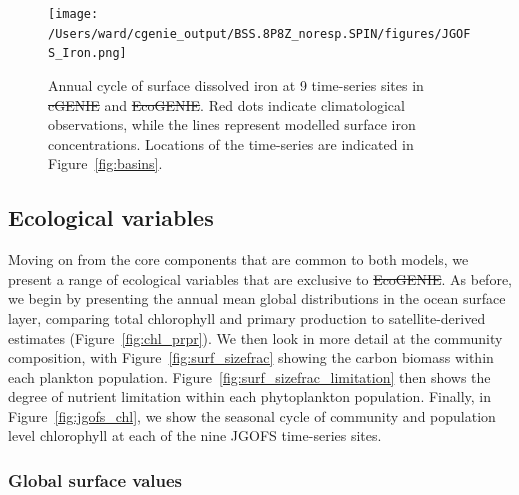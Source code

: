 \documentclass[gmd, manuscript]{copernicus}
\providecommand{\DIFadd}[1]{{\protect\color{blue}\uwave{#1}}} %
\providecommand{\DIFdel}[1]{{\protect\color{red}\sout{#1}}}                      %
\providecommand{\DIFaddbegin}{} %
\providecommand{\DIFaddend}{} %
\providecommand{\DIFdelbegin}{} %
\providecommand{\DIFdelend}{} %
\providecommand{\DIFaddFL}[1]{\DIFadd{#1}} %
\providecommand{\DIFdelFL}[1]{\DIFdel{#1}} %
\providecommand{\DIFaddbeginFL}{} %
\providecommand{\DIFaddendFL}{} %
\providecommand{\DIFdelbeginFL}{} %
\providecommand{\DIFdelendFL}{} %
\begin{document}
\begin{figure}[htbp]
\begin{center}
\DIFdelbeginFL %
\DIFdelendFL \DIFaddbeginFL \texttt{[image: /Users/ward/cgenie\_output/BSS.8P8Z\_noresp.SPIN/figures/JGOFS\_Iron.png]}
\DIFaddendFL \caption{Annual cycle of surface dissolved iron at 9 time-series sites in \DIFdelbeginFL \DIFdelFL{cGENIE }\DIFdelendFL \DIFaddbeginFL \DIFaddFL{cGEnIE }\DIFaddendFL and \DIFdelbeginFL \DIFdelFL{EcoGENIE}\DIFdelendFL \DIFaddbeginFL \DIFaddFL{EcoGEnIE}\DIFaddendFL . Red dots indicate climatological observations, while the 
lines represent modelled surface iron concentrations. Locations of the time-series are indicated in Figure~\ref{fig:basins}.}
\label{fig:jgofs_fe}
\end{center}
\end{figure}

\clearpage
\subsection{Ecological variables}

Moving on from the core components that are common to both models, we present a range of ecological variables that are exclusive to \DIFdelbegin \DIFdel{EcoGENIE}\DIFdelend \DIFaddbegin \DIFadd{EcoGEnIE}\DIFaddend . As before, we begin by presenting the annual mean global distributions in the ocean surface layer, comparing total chlorophyll and primary production to satellite-derived estimates (Figure~\ref{fig:chl_prpr}). We then look in more detail at the community composition, with Figure~\ref{fig:surf_sizefrac} showing the carbon biomass within each plankton population. Figure~\ref{fig:surf_sizefrac_limitation} then shows the degree of nutrient limitation within each phytoplankton population. Finally, in Figure~\ref{fig:jgofs_chl}, we show the seasonal cycle of community and population level chlorophyll at each of the nine JGOFS time-series sites.

\subsubsection{Global surface values}
\end{document}
